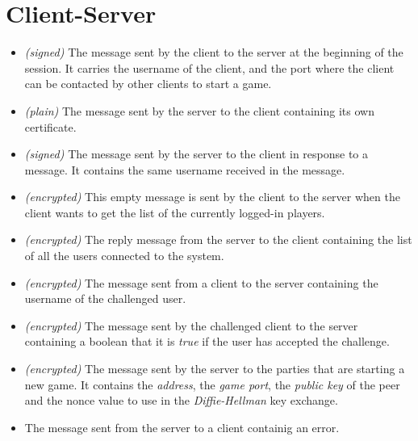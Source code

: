 \section{Client-Server}\label{sec:servermsgs}

\begin{itemize}
	\item[]  \emph{(signed)} The message sent by the
		client to the server at the beginning of the session. It carries
		the username of the client, and the port where the client can be
		contacted by other clients to start a game.
	\item[]  \emph{(plain)} The message sent by the
		server to the client containing its own certificate.
	\item[]  \emph{(signed)} The message sent by the
		server to the client in response to a 
		message. It contains the same username received in the
		 message.
	\item[]  \emph{(encrypted)} This empty
		message is sent by the client to the server when the client
		wants to get the list of the currently logged-in players.
	\item[]  \emph{(encrypted)} The reply message
		from the server to the client containing the list of all the
		users connected to the system.
	\item[]  \emph{(encrypted)} The message sent
		from a client to the server containing the username of the
		challenged user.
	\item[]  \emph{(encrypted)} The message sent by
		the challenged client to the server containing a boolean that it
		is \emph{true} if the user has accepted the challenge.
	\item[]  \emph{(encrypted)} The message sent by
		the server to the parties that are starting a new game. It
		contains the \emph{address}, the \emph{game port}, the
		\emph{public key} of the peer and the nonce value to use in the
		\textit{Diffie-Hellman} key exchange.
	\item[]  The message sent from the server to a client
		containig an error.
\end{itemize}
